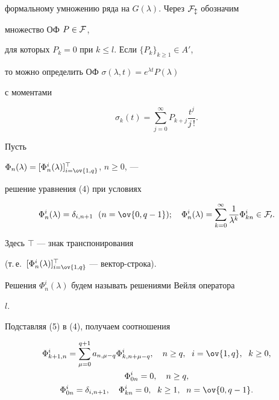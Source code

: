 формальному умножению ряда на $G(\lambda)$. Через $\cal F_l$ обозначим 


множество ОФ $P\in\cal F$, 


для которых $P_k=0$ при $k\le l$. Если $\{P_k\}_{k\ge 1}\in A'$, 


то можно определить ОФ $\sigma(\lambda,t)=e^{\lambda t}P(\lambda)$


с моментами 


$$ 


\sigma_k(t)=\sum^\infty_{j=0}P_{k+j}\frac{t^j}{j\,!}. 


$$ 


 


Пусть 


$\Phi_n(\lambda)=[\Phi^i_n(\lambda)]^\top_{i=\ov{1,q}}$, $n\ge 0$, --- 


решение уравнения (4) при условиях 


\begin{equation} 


\Phi^i_n(\lambda)=\delta_{i,n+1} \ \;(n=\ov{0,q-1});\quad 


\Phi^i_n(\lambda)=\sum^\infty_{k=0} 


\frac{1}{\lambda^k}\Phi^i_{kn}\in\cal F_0. 


\end{equation} 


Здесь $\top$ --- знак транспонирования 


(т.\,е.~$[\Phi^i_n(\lambda)]^\top_{i=\ov{1,q}}$ --- вектор-строка). 


Решения $\Phi^i_n(\lambda)$ будем называть решениями Вейля оператора 


$l$. 


 


Подставляя (5) в (4), получаем соотношения 


\begin{gather} 


\Phi^i_{k+1,n}=\sum^{q+1}_{\mu=0}a_{n,\mu-q} 


\Phi^i_{k,n+\mu-q},\quad n\ge q, \ \;i=\ov{1,q},\ \; k\ge 0, \\ 


\Phi^i_{0n}=0,\quad n\ge q, \\ 


\Phi^i_{0n}=\delta_{i,n+1},\quad \Phi^i_{kn}=0,\ \;k\ge 1, 


\ \;n=\ov{0,q-1}. 


\end{gather} 


